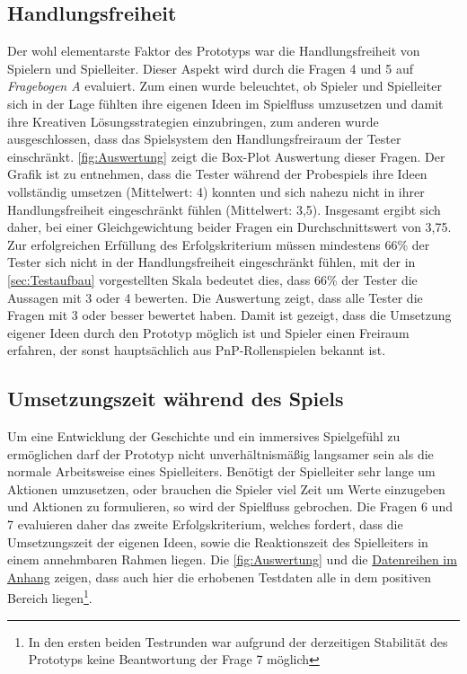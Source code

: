 \subsection{Handlungsfreiheit}
\label{sec:Handlungsfreiheit}
Der wohl elementarste Faktor des Prototyps war die Handlungsfreiheit von Spielern und Spielleiter. Dieser Aspekt wird durch die Fragen 4 und 5 auf \emph{Fragebogen A} evaluiert. Zum einen wurde beleuchtet, ob Spieler und Spielleiter sich in der Lage fühlten ihre eigenen Ideen im Spielfluss umzusetzen und damit ihre Kreativen Lösungsstrategien einzubringen, zum anderen wurde ausgeschlossen, dass das Spielsystem den Handlungsfreiraum der Tester einschränkt.\newline
\ref{fig:Auswertung} zeigt die Box-Plot Auswertung dieser Fragen. Der Grafik ist zu entnehmen, dass die Tester während der Probespiels ihre Ideen vollständig umsetzen (Mittelwert: 4) konnten und sich nahezu nicht in ihrer Handlungsfreiheit eingeschränkt fühlen (Mittelwert: 3,5). Insgesamt ergibt sich daher, bei einer Gleichgewichtung beider Fragen ein Durchschnittswert von 3,75. Zur erfolgreichen Erfüllung des Erfolgskriterium müssen mindestens 66\% der Tester sich nicht in der Handlungsfreiheit eingeschränkt fühlen, mit der in \ref{sec:Testaufbau} vorgestellten Skala bedeutet dies, dass 66\% der Tester die Aussagen mit 3 oder 4 bewerten.\newline
Die Auswertung zeigt, dass alle Tester die Fragen mit 3 oder besser bewertet haben. Damit ist gezeigt, dass die Umsetzung eigener Ideen durch den Prototyp möglich ist und Spieler einen Freiraum erfahren, der sonst hauptsächlich aus PnP-Rollenspielen bekannt ist.


	

\subsection{Umsetzungszeit während des Spiels}
\label{sec:Umsetzungszeit}
Um eine Entwicklung der Geschichte und ein immersives Spielgefühl zu ermöglichen darf der Prototyp nicht unverhältnismäßig langsamer sein als die normale Arbeitsweise eines Spielleiters. Benötigt der Spielleiter sehr lange um Aktionen umzusetzen, oder brauchen die Spieler viel Zeit um Werte einzugeben und Aktionen zu formulieren, so wird der Spielfluss gebrochen. Die Fragen 6 und 7 evaluieren daher das zweite Erfolgskriterium, welches fordert, dass die Umsetzungszeit der eigenen Ideen, sowie die Reaktionszeit des Spielleiters in einem annehmbaren Rahmen liegen.
Die \ref{fig:Auswertung} und die \hyperref[fig:tableData]{Datenreihen im Anhang} zeigen, dass auch hier die erhobenen Testdaten alle in dem positiven Bereich liegen\footnote{In den ersten beiden Testrunden war aufgrund der derzeitigen Stabilität des Prototyps keine Beantwortung der Frage 7 möglich}.

